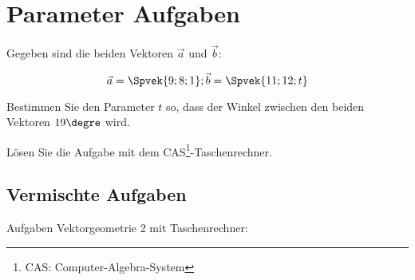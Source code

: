 \section{Parameter Aufgaben}

Gegeben sind die beiden Vektoren $\vec{a}$ und $\vec{b}$:

$$\vec{a} = \Spvek{9;8;1}; \vec{b} = \Spvek{11;12;t}$$

Bestimmen Sie den Parameter $t$ so, dass der Winkel zwischen den
beiden Vektoren $19\degre$ wird.

Lösen Sie die Aufgabe mit dem CAS\footnote{CAS: Computer-Algebra-System}-Taschenrechner.



\newpage
\subsection{Vermischte Aufgaben}
Aufgaben Vektorgeometrie 2 mit Taschenrechner:



